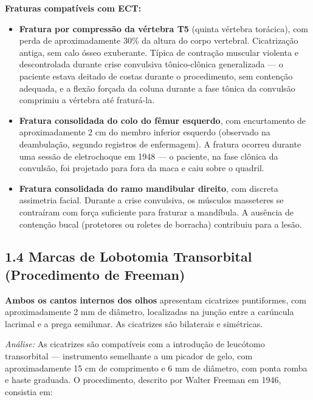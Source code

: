 \textbf{Fraturas compatíveis com ECT:}
\begin{itemize}
    \item \textbf{Fratura por compressão da vértebra T5} (quinta vértebra torácica), com perda de aproximadamente 30\% da altura do corpo vertebral. Cicatrização antiga, sem calo ósseo exuberante. Típica de contração muscular violenta e descontrolada durante crise convulsiva tônico-clônica generalizada --- o paciente estava deitado de costas durante o procedimento, sem contenção adequada, e a flexão forçada da coluna durante a fase tônica da convulsão comprimiu a vértebra até fraturá-la.
    \item \textbf{Fratura consolidada do colo do fêmur esquerdo}, com encurtamento de aproximadamente 2 cm do membro inferior esquerdo (observado na deambulação, segundo registros de enfermagem). A fratura ocorreu durante uma sessão de eletrochoque em 1948 --- o paciente, na fase clônica da convulsão, foi projetado para fora da maca e caiu sobre o quadril.
    \item \textbf{Fratura consolidada do ramo mandibular direito}, com discreta assimetria facial. Durante a crise convulsiva, os músculos masseteres se contraíram com força suficiente para fraturar a mandíbula. A ausência de contenção bucal (protetores ou roletes de borracha) contribuiu para a lesão.
\end{itemize}

\subsection*{1.4 Marcas de Lobotomia Transorbital (Procedimento de Freeman)}

\textbf{Ambos os cantos internos dos olhos} apresentam cicatrizes puntiformes, com aproximadamente 2 mm de diâmetro, localizadas na junção entre a carúncula lacrimal e a prega semilunar. As cicatrizes são bilaterais e simétricas.

\textit{Análise:} As cicatrizes são compatíveis com a introdução de leucótomo transorbital --- instrumento semelhante a um picador de gelo, com aproximadamente 15 cm de comprimento e 6 mm de diâmetro, com ponta romba e haste graduada. O procedimento, descrito por Walter Freeman em 1946, consistia em:

